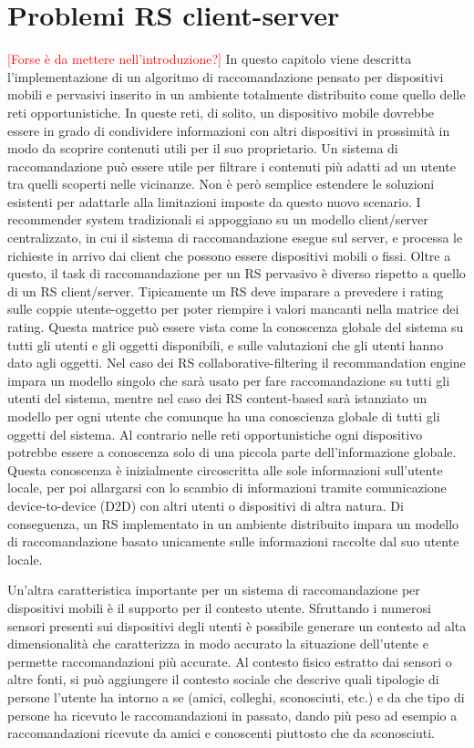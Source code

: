 \section{Problemi RS client-server}
\textcolor{red}{[Forse è da mettere nell'introduzione?]}
In questo capitolo viene descritta l'implementazione di un algoritmo di raccomandazione pensato per dispositivi mobili e pervasivi inserito in un ambiente totalmente distribuito come quello delle reti opportunistiche.
In queste reti, di solito, un dispositivo mobile dovrebbe essere in grado di condividere informazioni con altri dispositivi in prossimità in modo da scoprire contenuti utili per il suo proprietario. Un sistema di raccomandazione può essere utile per filtrare i contenuti più adatti ad un utente tra quelli scoperti nelle vicinanze. Non è però semplice estendere le soluzioni esistenti per adattarle alla limitazioni imposte da questo nuovo scenario. I recommender system tradizionali si appoggiano su un modello client/server centralizzato, in cui il sistema di raccomandazione esegue sul server, e processa le richieste in arrivo dai client che possono essere dispositivi mobili o fissi. Oltre a questo, il task di raccomandazione per un RS pervasivo è diverso rispetto a quello di un RS client/server. Tipicamente un RS deve imparare a prevedere i rating sulle coppie utente-oggetto per poter riempire i valori mancanti nella matrice dei rating. Questa matrice può essere vista come la conoscenza globale del sistema su tutti gli utenti e gli oggetti disponibili, e sulle valutazioni che gli utenti hanno dato agli oggetti. Nel caso dei RS collaborative-filtering il recommandation engine impara un modello singolo che sarà usato per fare raccomandazione su tutti gli utenti del sistema, mentre nel caso dei RS content-based sarà istanziato un modello per ogni utente che comunque ha una conoscienza globale di tutti gli oggetti del sistema. Al contrario nelle reti opportunistiche ogni dispositivo potrebbe essere a conoscenza solo di una piccola parte dell'informazione globale. Questa conoscenza è inizialmente circoscritta alle sole informazioni sull'utente locale, per poi allargarsi con lo scambio di informazioni tramite comunicazione device-to-device (D2D) con altri utenti o dispositivi di altra natura. Di conseguenza, un RS implementato in un ambiente distribuito impara un modello di raccomandazione basato unicamente sulle informazioni raccolte dal suo utente locale.

Un'altra caratteristica importante per un sistema di raccomandazione per dispositivi mobili è il supporto per il contesto utente. Sfruttando i numerosi sensori presenti sui dispositivi degli utenti è possibile generare un contesto ad alta dimensionalità che caratterizza in modo accurato la situazione dell'utente e permette raccomandazioni più accurate. Al contesto fisico estratto dai sensori o altre fonti, si può aggiungere il contesto sociale che descrive quali tipologie di persone l'utente ha intorno a se (amici, colleghi, sconosciuti, etc.) e da che tipo di persone ha ricevuto le raccomandazioni in passato, dando più peso ad esempio a raccomandazioni ricevute da amici e conoscenti piuttosto che da sconosciuti.

